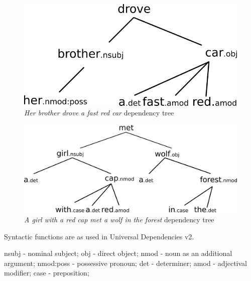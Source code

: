 \documentclass{article}
\begin{document}
\subsection{}
\begin{figure}[h!]
	\includegraphics[width=\linewidth]{2aidep.png}
	\caption{\textit{Her brother drove a fast red car} dependency tree}
	\label{fig:2aidep}
\end{figure}

\begin{figure}[h!]
	\includegraphics[width=\linewidth]{2aiidep.png}
	\caption{\textit{A girl with a red cap met a wolf in the forest} dependency
	tree}
	\label{fig:2aiidep}
\end{figure}

Syntactic functions are as used in Universal Dependencies v2.

nsubj - nominal subject;
obj - direct object;
nmod - noun as an additional argument;
nmod:poss - possessive pronoun;
det - determiner;
amod - adjectival modifier;
case - preposition;
\end{document}
